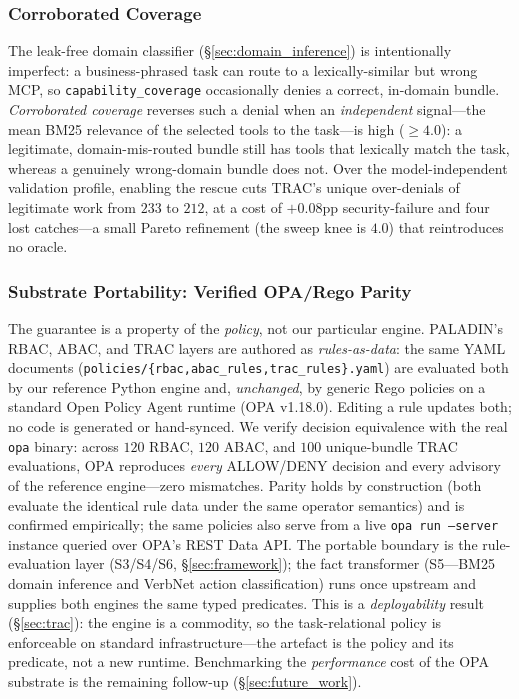 \documentclass[sigconf,review,anonymous]{acmart}
\begin{document}
\subsubsection{Corroborated Coverage}
\label{sec:corroborated}

The leak-free domain classifier (\S\ref{sec:domain_inference}) is intentionally imperfect: a business-phrased task can route to a lexically-similar but wrong MCP, so \texttt{capability\_coverage} occasionally denies a correct, in-domain bundle. \emph{Corroborated coverage} reverses such a denial when an \emph{independent} signal---the mean BM25 relevance of the selected tools to the task---is high ($\geq\!4.0$): a legitimate, domain-mis-routed bundle still has tools that lexically match the task, whereas a genuinely wrong-domain bundle does not. Over the model-independent validation profile, enabling the rescue cuts TRAC's unique over-denials of legitimate work from $233$ to $212$, at a cost of $+0.08$pp security-failure and four lost catches---a small Pareto refinement (the sweep knee is $4.0$) that reintroduces no oracle.

\subsubsection{Substrate Portability: Verified OPA/Rego Parity}
\label{sec:substrate_portability}

The guarantee is a property of the \emph{policy}, not our particular engine. PALADIN's RBAC, ABAC, and TRAC layers are authored as \emph{rules-as-data}: the same YAML documents (\texttt{policies/\{rbac,abac\_rules,trac\_rules\}.yaml}) are evaluated both by our reference Python engine and, \emph{unchanged}, by generic Rego policies on a standard Open Policy Agent runtime (OPA v1.18.0). Editing a rule updates both; no code is generated or hand-synced. We verify decision equivalence with the real \texttt{opa} binary: across $120$ RBAC, $120$ ABAC, and $100$ unique-bundle TRAC evaluations, OPA reproduces \emph{every} ALLOW/DENY decision and every advisory of the reference engine---zero mismatches. Parity holds by construction (both evaluate the identical rule data under the same operator semantics) and is confirmed empirically; the same policies also serve from a live \texttt{opa run --server} instance queried over OPA's REST Data API. The portable boundary is the rule-evaluation layer (S3/S4/S6, \S\ref{sec:framework}); the fact transformer (S5---BM25 domain inference and VerbNet action classification) runs once upstream and supplies both engines the same typed predicates. This is a \emph{deployability} result (\S\ref{sec:trac}): the engine is a commodity, so the task-relational policy is enforceable on standard infrastructure---the artefact is the policy and its predicate, not a new runtime. Benchmarking the \emph{performance} cost of the OPA substrate is the remaining follow-up (\S\ref{sec:future_work}).
\end{document}
